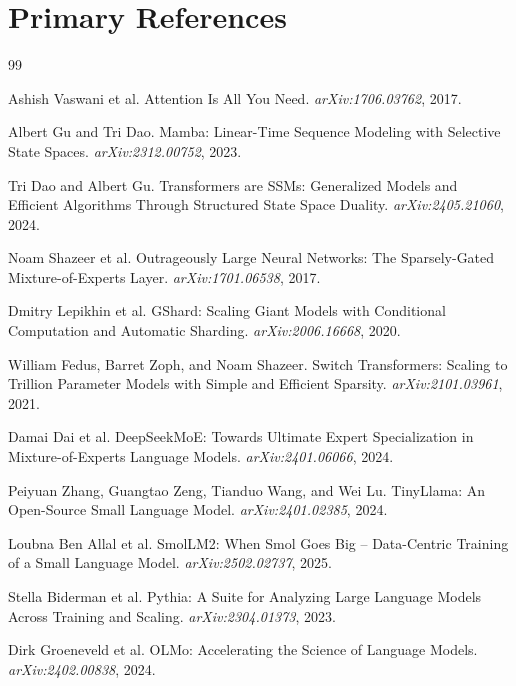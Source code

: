 \documentclass[11pt]{article}
\begin{document}
\section{Primary References}

\begin{thebibliography}{99}

Ashish Vaswani et al.
\newblock Attention Is All You Need.
\newblock \emph{arXiv:1706.03762}, 2017.

Albert Gu and Tri Dao.
\newblock Mamba: Linear-Time Sequence Modeling with Selective State Spaces.
\newblock \emph{arXiv:2312.00752}, 2023.

Tri Dao and Albert Gu.
\newblock Transformers are SSMs: Generalized Models and Efficient Algorithms Through Structured State Space Duality.
\newblock \emph{arXiv:2405.21060}, 2024.

Noam Shazeer et al.
\newblock Outrageously Large Neural Networks: The Sparsely-Gated Mixture-of-Experts Layer.
\newblock \emph{arXiv:1701.06538}, 2017.

Dmitry Lepikhin et al.
\newblock GShard: Scaling Giant Models with Conditional Computation and Automatic Sharding.
\newblock \emph{arXiv:2006.16668}, 2020.

William Fedus, Barret Zoph, and Noam Shazeer.
\newblock Switch Transformers: Scaling to Trillion Parameter Models with Simple and Efficient Sparsity.
\newblock \emph{arXiv:2101.03961}, 2021.

Damai Dai et al.
\newblock DeepSeekMoE: Towards Ultimate Expert Specialization in Mixture-of-Experts Language Models.
\newblock \emph{arXiv:2401.06066}, 2024.

Peiyuan Zhang, Guangtao Zeng, Tianduo Wang, and Wei Lu.
\newblock TinyLlama: An Open-Source Small Language Model.
\newblock \emph{arXiv:2401.02385}, 2024.

Loubna Ben Allal et al.
\newblock SmolLM2: When Smol Goes Big -- Data-Centric Training of a Small Language Model.
\newblock \emph{arXiv:2502.02737}, 2025.

Stella Biderman et al.
\newblock Pythia: A Suite for Analyzing Large Language Models Across Training and Scaling.
\newblock \emph{arXiv:2304.01373}, 2023.

Dirk Groeneveld et al.
\newblock OLMo: Accelerating the Science of Language Models.
\newblock \emph{arXiv:2402.00838}, 2024.


\end{thebibliography}
\end{document}
